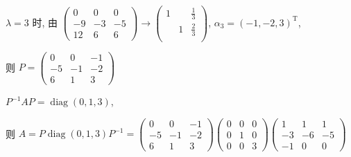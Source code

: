 \begin{enumerate}
			       \( \lambda = 3 \) 时, 由 \( \begin{pmatrix}
				       0  & 0  & 0  \\
				       -9 & -3 & -5 \\
				       12 & 6  & 6
			       \end{pmatrix} \rightarrow \begin{pmatrix}
				       1 &   & \frac{1}{3} \\
				         & 1 & \frac{2}{3} \\
				         &   &
			       \end{pmatrix} \), \( \alpha_{3} = (-1, -2, 3)^{\mathrm{T}} \),

			       则 \( P = \begin{pmatrix}
				       0  & 0  & -1 \\
				       -5 & -1 & -2 \\
				       6  & 1  & 3
			       \end{pmatrix} \)

			       \( P^{-1}AP = \operatorname{diag}(0, 1, 3) \),

			       则 \( A = P\operatorname{diag}(0, 1, 3)P^{-1} = \begin{pmatrix}
				       0  & 0  & -1 \\
				       -5 & -1 & -2 \\
				       6  & 1  & 3
			       \end{pmatrix}\begin{pmatrix}
				       0 & 0 & 0 \\
				       0 & 1 & 0 \\
				       0 & 0 & 3
			       \end{pmatrix}\begin{pmatrix}
				       1  & 1  & 1  \\
				       -3 & -6 & -5 \\
				       -1 & 0  & 0
			       \end{pmatrix} \)


\end{enumerate}
